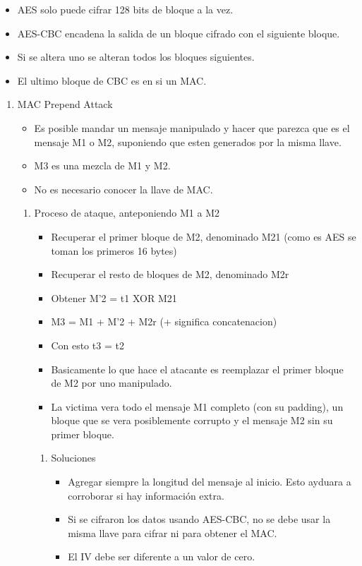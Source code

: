 \documentclass[11pt]{article}
\begin{document}
\begin{enumerate}
\begin{itemize}
\item AES solo puede cifrar 128 bits de bloque a la vez.
\item AES-CBC encadena la salida de un bloque cifrado con el siguiente bloque.
\item Si se altera uno se alteran todos los bloques siguientes.
\item El ultimo bloque de CBC es en si un MAC.
\end{itemize}
\begin{enumerate}
\item MAC Prepend Attack
\label{sec:org9237df5}
\begin{itemize}
\item Es posible mandar un mensaje manipulado y hacer que parezca que es el mensaje M1 o M2, suponiendo que esten generados por la misma llave.
\item M3 es una mezcla de M1 y M2.
\item No es necesario conocer la llave de MAC.
\end{itemize}
\begin{enumerate}
\item Proceso de ataque, anteponiendo M1 a M2
\label{sec:orgcc1b0b2}
\begin{itemize}
\item Recuperar el primer bloque de M2, denominado M21 (como es AES se toman los primeros 16 bytes)
\item Recuperar el resto de bloques de M2, denominado M2r
\item Obtener M'2 = t1 XOR M21
\item M3 = M1 + M'2 + M2r (+ significa concatenacion)
\item Con esto t3 = t2

\item Basicamente lo que hace el atacante es reemplazar el primer bloque de M2 por uno manipulado.
\item La victima vera todo el mensaje M1 completo (con su padding), un bloque que se vera posiblemente corrupto y el mensaje M2 sin su primer bloque.
\end{itemize}
\begin{enumerate}
\item Soluciones
\label{sec:org7a1db12}
\begin{itemize}
\item Agregar siempre la longitud del mensaje al inicio. Esto ayduara a corroborar si hay información extra.
\item Si se cifraron los datos usando AES-CBC, no se debe usar la misma llave para cifrar ni para obtener el MAC.
\item El IV debe ser diferente a un valor de cero.
\end{itemize}
\end{enumerate}
\end{enumerate}
\end{enumerate}
\end{enumerate}
\end{document}
